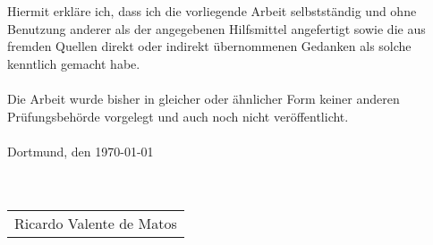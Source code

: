 Hiermit erkläre ich, dass ich die vorliegende Arbeit selbstständig
und ohne Benutzung anderer als der angegebenen Hilfsmittel angefertigt
sowie die aus fremden Quellen direkt oder indirekt übernommenen
Gedanken als solche kenntlich gemacht habe. \\ \\
Die Arbeit wurde bisher in gleicher oder ähnlicher Form keiner
anderen Prüfungsbehörde vorgelegt und auch noch nicht veröffentlicht. \\ \\
Dortmund, den \today \\ \\ \\
\begin{tabular}{@{}l@{}}\hline
	Ricardo Valente de Matos
\end{tabular}
\setcounter{page}{6}